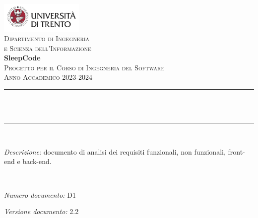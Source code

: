 \begin{titlepage}
\newcommand{\HRule}{\rule{\linewidth}{0.3mm}} %
\center %

\includegraphics[width=0.3\textwidth]{materiale/UniTrento_logo_ITA_colore.png}\\[0.5cm]
\textsc{\Large Dipartimento di Ingegneria\\e Scienza dell'Informazione}\\[1.5cm]

{\Huge\textbf{SleepCode}}\\[0.5cm]
\textsc{\large Progetto per il Corso di Ingegneria del Software}\\
\textsc{\large Anno Accademico 2023-2024}\\[0.5cm]


\HRule\\[0.4cm]
{\huge\bfseries \@title}\\[0.1cm]
\HRule\\[1cm]

\begin{minipage}{\textwidth}
\begin{flushleft}
\textit{Descrizione:} documento di analisi dei requisiti funzionali, non funzionali, front-end e back-end.
\end{flushleft}
\end{minipage}\\[1.5cm]


\begin{minipage}{0.4\textwidth}
\begin{flushleft}
\large
\textit{Numero documento:} D1
\end{flushleft}
\end{minipage}
\begin{minipage}{0.4\textwidth}
\begin{flushright}
\large
\textit{Versione documento:} 2.2
\end{flushright}
\end{minipage}\\[1.5cm]


\end{titlepage}

